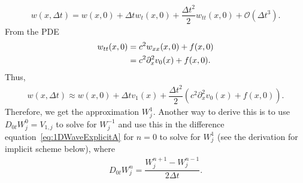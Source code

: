 \documentclass[11pt]{article}
\begin{document}
\begin{align}
w(x,\Delta t) = w(x,0)+\Delta t w_t(x,0)+\dfrac{\Delta t^2}{2}w_{tt}(x,0)+\mathcal{O}(\Delta t^3).
\end{align}
From the PDE
\begin{align}
w_{tt}(x,0)&=c^2w_{xx}(x,0)+f(x,0) \notag \\
&=c^2\partial_x^2v_0(x)+f(x,0).
\end{align}
Thus,
\begin{align}
w(x,\Delta t) \approx  w(x,0)+\Delta t v_1(x)+\dfrac{\Delta t^2}{2}\left(c^2\partial_x^2v_0(x)+f(x,0) \right).
\end{align}
Therefore, we get the approximation $W_j^1$. Another way to derive this is to use $D_{0t}W_j^0=V_{1,j}$ to solve for $W_j^{-1}$ and use this in the difference equation~\eqref{eq:1DWaveExplicitA} for $n=0$ to solve for $W_j^1$ (see the derivation for implicit scheme below), where
\begin{align}
D_{0t}W_j^n=\dfrac{W_{j}^{n+1}-W_{j}^{n-1}}{2\Delta t}.
\end{align}
\end{document}
